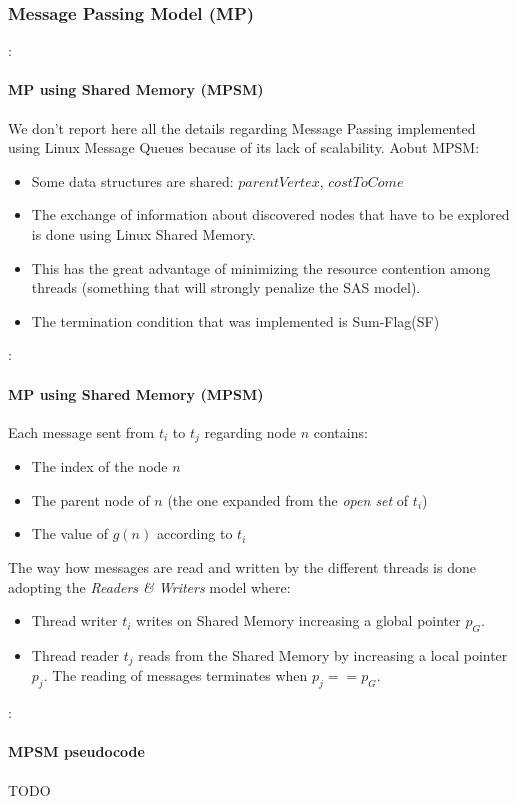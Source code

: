 \documentclass[12pt]{beamer}
\begin{document}
	\subsubsection{Message Passing Model (MP)}
	\begin{frame}{\secname : \subsecname}
		\framesubtitle{MP using Shared Memory (MPSM)}
		We don't report here all the details regarding Message Passing implemented using Linux Message Queues
		because of its lack of scalability. Aobut MPSM:
		\begin{itemize}
			\item Some data structures are shared: $parentVertex$, $costToCome$
			\item The exchange of information about discovered nodes that have to be explored is done
				  using Linux Shared Memory.
			\item This has the great advantage of minimizing the resource contention among threads 
			      (something that will strongly penalize the SAS model).
			\item The termination condition that was implemented is Sum-Flag(SF)
		\end{itemize}
	\end{frame}
	\begin{frame}{\secname : \subsecname}
		\framesubtitle{MP using Shared Memory (MPSM)}
		Each message sent from $t_i$ to $t_j$ regarding node $n$ contains:
		\begin{itemize}
			\item The index of the node $n$
			\item The parent node of $n$ (the one expanded from the \textit{open set} of $t_i$)
			\item The value of $g(n)$ according to $t_i$
		\end{itemize}
		The way how messages are read and written by the different threads is done adopting the \textit{Readers \& Writers}
		model where:
		\begin{itemize}
		\item Thread writer $t_i$ writes on Shared Memory increasing a global pointer $p_G$.
		\item Thread reader $t_j$ reads from the Shared Memory by increasing a local pointer $p_j$. The reading
				of messages terminates when $p_j == p_G$.
		\end{itemize}
	\end{frame}
	\begin{frame}{\secname : \subsecname}
		\framesubtitle{MPSM pseudocode}
		TODO
	\end{frame}
\end{document}
